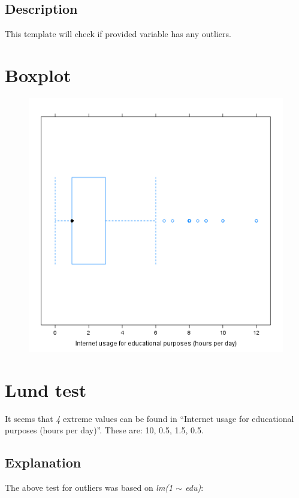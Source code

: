 \documentclass{article}
\makeatletter
\def\maxwidth{\ifdim\Gin@nat@width>\linewidth\linewidth
\else\Gin@nat@width\fi}
\let\Oldincludegraphics\includegraphics
\renewcommand{\includegraphics}[1]{\Oldincludegraphics[width=\maxwidth]{#1}}
\makeatother
\begin{document}
\subsection{Description}

This template will check if provided variable has any outliers.

\section{Boxplot}

\begin{figure}[htbp]
\centering
\includegraphics{d24b3eb41da4d1de21d4bce0e30d2e1b.png}
\caption{}
\end{figure}

\section{Lund test}

It seems that \emph{4} extreme values can be found in ``Internet usage
for educational purposes (hours per day)''. These are: 10, 0.5, 1.5,
0.5.

\subsection{Explanation}

The above test for outliers was based on \emph{lm(1 \ensuremath{\sim}
edu)}:
\end{document}
